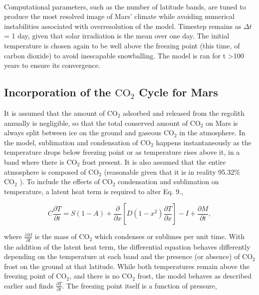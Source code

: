 \documentclass[12pt,onecolumn]{revtex4-2}    %
\begin{document}
\

Computational parameters, such as the number of latitude bands, are tuned to produce the most resolved image of Mars' climate while avoiding numerical instabilities associated with overresolution of the model. Timestep remains as $\Delta t$ = 1 day, given that solar irradiation is the mean over one day. The initial temperature is chosen again to be well above the freezing point (this time, of carbon dioxide) to avoid inescapable snowballing. The model is ran for t \textgreater 100 years to ensure its convergence.

\subsection{Incorporation of the $\mathrm{CO_2}$ Cycle for Mars}

It is assumed that the amount of $\mathrm{CO_2}$ adsorbed and released from the regolith annually is negligible, so that the total conserved amount of $\mathrm{CO_2}$ on Mars is always split between ice on the ground and gaseous $\mathrm{CO_2}$ in the atmosphere. In the model, sublimation and condensation of $\mathrm{CO_2}$ happens instantaneously as the temperature drops below freezing point or as temperature rises above it, in a band where there is $\mathrm{CO_2}$ frost present. It is  also assumed that the entire atmosphere is composed of $\mathrm{CO_2}$ (reasonable given that it is in reality 95.32\% $\mathrm{CO_2}$ \cite{JN82}). To include the effects of $\mathrm{CO_2}$ condensation and sublimation on temperature, a latent heat term is required to alter Eq. 9.,  %

\begin{equation}
C \frac{\partial T}{\partial t} = S(1-A) + \frac{\partial}{\partial x} [D(1-x^{2})\frac{\partial T}{\partial x}] - I + \frac{\partial M}{\partial t},
\end{equation}

where $\frac{\partial M}{\partial t}$ is the mass of $\mathrm{CO_2}$ which condenses or sublimes per unit time. With the addition of the latent heat term, the differential equation behaves differently depending on the temperature at each band and the presence (or absence) of $\mathrm{CO_2}$ frost on the ground at that latitude. While both temperatures remain above the freezing point of $\mathrm{CO_2}$, and there is no $\mathrm{CO_2}$ frost, the model behaves as described earlier and finds $\frac{\partial T}{\partial t}$. The freezing point itself is a function of pressure, 
\end{document}
